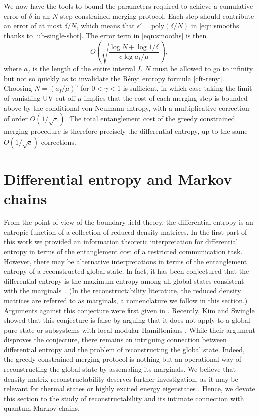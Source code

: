 \documentclass[12pt]{article}
\begin{document}
We now have the tools to bound the parameters required to achieve a cumulative error of $\delta$ in an $N$-step constrained merging protocol. Each step should contribute an error of at most $\delta/N$, which means that $\epsilon' = \text{poly}(\delta/N)$ in \eqref{eqn:smooths} thanks to \eqref{ub-single-shot}. The error term in \eqref{eqn:smooths} is then
\begin{equation}
O\left( \sqrt{ \frac{\log N + \log 1/\delta}{c \log a_I/\mu} } \right),
\end{equation}
where $a_I$ is the length of the entire interval $I$. $N$ must be allowed to go to infinity but not so quickly as to invalidate the R\'enyi entropy formula \eqref{cft-renyi}. Choosing $N=(a_I/\mu)^\gamma$ for $0 < \gamma < 1$ is sufficient, in which case taking the limit of vanishing UV cut-off $\mu$ implies that the cost of each merging step is bounded above by the conditional von Neumann entropy, with a multiplicative correction of order $O(1/\sqrt{c})$. The total entanglement cost of the greedy constrained merging procedure is therefore precisely the differential entropy, up to the same $O(1/\sqrt{c})$ corrections.


\section{Differential entropy and Markov chains}
\label{secmarkov}

From the point of view of the boundary field theory, the differential entropy is an entropic function of a collection of reduced density matrices. In the first part of this work we provided an information theoretic interpretation for differential entropy in terms of the entanglement cost of a restricted communication task. However, there may be alternative interpretations in terms of the entanglement entropy of a reconstructed global state. In fact, it has been conjectured that the differential entropy is the maximum entropy among all global states consistent with the marginals~\cite{holeography}. (In the reconstructability literature, the reduced density matrices are referred to as marginals, a nomenclature we follow in this section.) Arguments against this conjecture were first given in \cite{veronikajune}. Recently, Kim and Swingle showed that this conjecture is false by arguing that it does not apply to a global  pure state or subsystems with local modular Hamiltonians \cite{swingle-kim}. While their argument disproves the conjecture, there remains an intriguing connection between differential entropy and the problem of reconstructing the global state. Indeed, the greedy constrained merging protocol is nothing but an operational way of reconstructing the global state by assembling its marginals. We believe that density matrix reconstructability deserves further investigation, as it may be relevant for thermal states or highly excited energy eigenstates \cite{swingle-kim}. Hence, we devote this section to the study of reconstructability and its intimate connection with quantum Markov chains.
\end{document}
